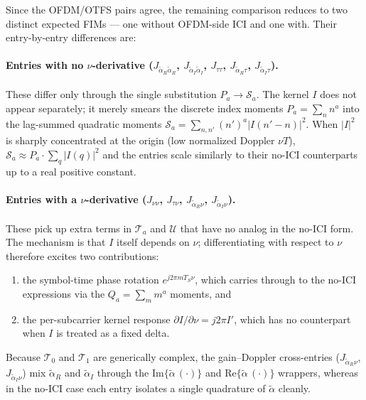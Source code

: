\documentclass[11pt]{article}
\begin{document}
Since the OFDM/OTFS pairs agree, the remaining comparison reduces to
two distinct expected FIMs --- one without OFDM-side ICI and one with.
Their entry-by-entry differences are:

\paragraph{Entries with no \(\nu\)-derivative
(\(J_{\tilde{\alpha}_R\tilde{\alpha}_R}\),
\(J_{\tilde{\alpha}_I\tilde{\alpha}_I}\),
\(J_{\tau\tau}\),
\(J_{\tilde{\alpha}_R\tau}\),
\(J_{\tilde{\alpha}_I\tau}\)).}
These differ only through the single substitution
\(P_a \to \mathcal{S}_a\). The kernel \(I\) does not appear separately;
it merely smears the discrete index moments \(P_a = \sum_{n} n^a\) into
the lag-summed quadratic moments
\(\mathcal{S}_a = \sum_{n,n'} (n')^a |I(n'-n)|^2\). When \(|I|^2\) is
sharply concentrated at the origin (low normalized Doppler \(\nu T\)),
\(\mathcal{S}_a \approx P_a \cdot \sum_q |I(q)|^2\) and the entries
scale similarly to their no-ICI counterparts up to a real positive
constant.

\paragraph{Entries with a \(\nu\)-derivative
(\(J_{\nu\nu}\),
\(J_{\tau\nu}\),
\(J_{\tilde{\alpha}_R\nu}\),
\(J_{\tilde{\alpha}_I\nu}\)).}
These pick up extra terms in \(\mathcal{T}_a\) and \(\mathcal{U}\)
that have no analog in the no-ICI form. The mechanism is that \(I\)
itself depends on \(\nu\); differentiating with respect to \(\nu\)
therefore excites two contributions:
\begin{enumerate}
    \item the symbol-time phase rotation \(e^{j2\pi mT_S\nu}\), which
          carries through to the no-ICI expressions via the
          \(Q_a = \sum_m m^a\) moments, and
    \item the per-subcarrier kernel response \(\partial I/\partial\nu
          = j2\pi I'\), which has no counterpart when \(I\) is treated
          as a fixed delta.
\end{enumerate}
Because \(\mathcal{T}_0\) and \(\mathcal{T}_1\) are generically
complex, the gain--Doppler cross-entries
(\(J_{\tilde{\alpha}_R\nu}\), \(J_{\tilde{\alpha}_I\nu}\)) mix
\(\tilde{\alpha}_R\) and \(\tilde{\alpha}_I\) through the
\(\mathrm{Im}\{\tilde{\alpha}\,(\cdot)\}\) and
\(\mathrm{Re}\{\tilde{\alpha}\,(\cdot)\}\) wrappers, whereas in the
no-ICI case each entry isolates a single quadrature of
\(\tilde{\alpha}\) cleanly.
\end{document}
